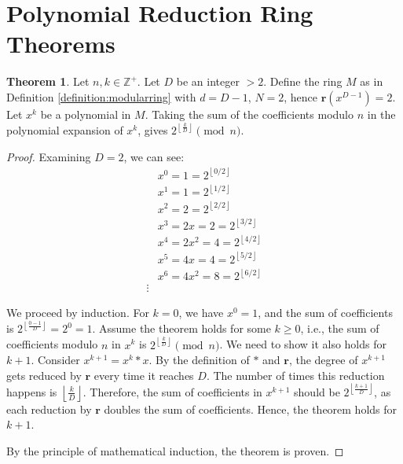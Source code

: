 \documentclass{article}
\theoremstyle{plain}
\theoremstyle{definition}
\newtheorem{theorem}{Theorem}
\newcommand{\floor}[1]{\left\lfloor #1 \right\rfloor}
\newcommand{\redu}{\textbf{r}}
\newcommand{\Z}{\mathbb{Z}}
\begin{document}
\section{Polynomial Reduction Ring Theorems}

\begin{theorem} \label{theorem:polyflooredpowersoftwo}
Let $n, k \in \Z^+$. Let $D$ be an integer $>2$. Define the ring $M$ as in Definition \ref{definition:modularring} with $d=D-1$, $N=2$, hence $\redu(x^{D-1}) = 2$. Let $x^k$ be a polynomial in $M$. Taking the sum of the coefficients modulo $n$ in the polynomial expansion of \( x^k \), gives $2^{\left\lfloor \frac{k}{D} \right\rfloor} \pmod{n}$.
\end{theorem}
\begin{proof}
Examining $D = 2$, we can see:
\begin{align*}
& x^0 = 1 = 2^{\floor{0/2}} \\
& x^1 = 1 = 2^{\floor{1/2}} \\
& x^2 = 2 = 2^{\floor{2/2}}\\
& x^3 = 2x = 2 = 2^{\floor{3/2}}\\
& x^4 = 2x^2 = 4 = 2^{\floor{4/2}}\\
& x^5 = 4x = 4 = 2^{\floor{5/2}}\\
& x^6 = 4x^2 = 8 = 2^{\floor{6/2}}\\
\vdots
\end{align*}

We proceed by induction. For \( k = 0 \), we have \( x^0 = 1 \), and the sum of coefficients is \( 2^{\floor{\frac{0-1}{D}}} = 2^{0} = 1 \). Assume the theorem holds for some \( k \geq 0 \), i.e., the sum of coefficients modulo \( n \) in \( x^k \) is \( 2^{\floor{\frac{k}{D}}} \pmod{n} \). We need to show it also holds for \( k+1 \). Consider \( x^{k+1} = x^k \ast x \). By the definition of \( \ast \) and \( \redu \), the degree of \( x^{k+1} \) gets reduced by \( \redu \) every time it reaches \( D \). The number of times this reduction happens is \( \floor{\frac{k}{D}} \). Therefore, the sum of coefficients in \( x^{k+1} \) should be \( 2^{\left\lfloor \frac{k+1}{D} \right\rfloor} \), as each reduction by \( \redu \) doubles the sum of coefficients. Hence, the theorem holds for \( k+1 \).

By the principle of mathematical induction, the theorem is proven.
\end{proof}
\end{document}
